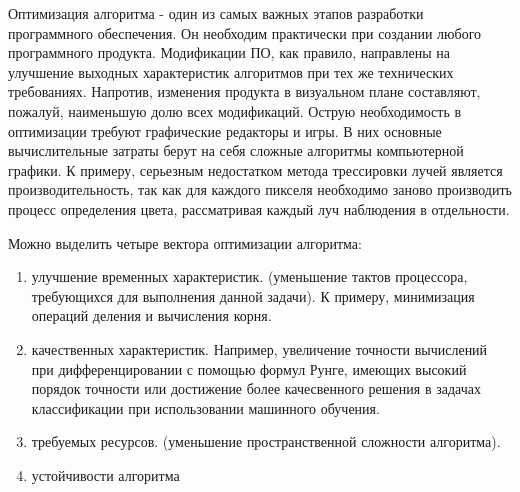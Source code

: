 \Introduction

 Оптимизация алгоритма - один из самых важных этапов разработки программного обеспечения. Он необходим практически при создании любого программного продукта. Модификации ПО, как правило, направлены на улучшение выходных характеристик алгоритмов при тех же технических требованиях. Напротив, изменения  продукта в визуальном плане составляют, пожалуй, наименьшую долю всех модификаций. Острую необходимость в оптимизации  требуют графические редакторы и игры. В них основные вычислительные затраты берут на себя сложные алгоритмы компьютерной графики. К примеру, серьезным недостатком метода трессировки лучей является производительность, так как для каждого пикселя необходимо заново производить процесс определения цвета, рассматривая каждый луч наблюдения в отдельности.
 
Можно выделить четыре вектора оптимизации алгоритма: 
\begin{enumerate}
\item улучшение временных характеристик. (уменьшение тактов процессора, требующихся для выполнения данной задачи). К примеру, минимизация операций деления и вычисления корня. 
\item качественных характеристик. Например, увеличение точности вычислений при дифференцировании с помощью формул Рунге, имеющих высокий порядок точности или достижение более качесвенного решения в задачах классификации  при использовании машинного обучения.
\item требуемых ресурсов. (уменьшение пространственной сложности алгоритма).
\item устойчивости алгоритма 
\end{enumerate}
 
 
 
 
 
 
 
